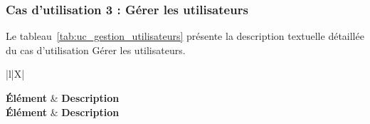 \subsubsection{Cas d'utilisation 3 : Gérer les utilisateurs}
Le tableau~\ref{tab:uc_gestion_utilisateurs} présente la description textuelle 
détaillée du cas d'utilisation \og{}Gérer les utilisateurs\fg{}.

\vspace{0.2cm}
\begin{xltabular}{\textwidth}{|l|X|}
    
    \hline
     \textbf{Élément} & \textbf{Description} \\ \hline
    \endfirsthead
    \hline
     \textbf{Élément} & \textbf{Description} \\ \hline
    \endhead
    \hline
    \endfoot
    \endfoot
    \endlastfoot


\end{xltabular}
